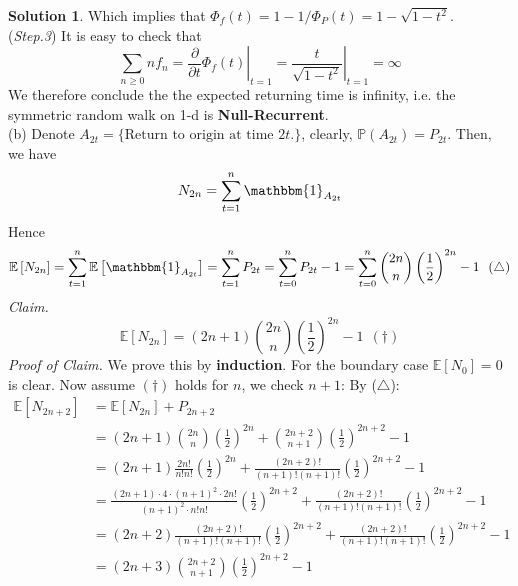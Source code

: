 \documentclass[a4paper, 10pt]{article}
\theoremstyle{definition}
\theoremstyle{hSol}
\newtheorem*{solution}{Solution}
\begin{document}
\begin{solution}
Which implies that $\Phi_f(t) = 1-1/\Phi_P(t)=1-\sqrt{1-t^2}$.\\
(\textit{Step.3}) It is easy to check that
\begin{equation}
  \sum_{n\geq 0} nf_n = \left.\frac{\partial}{\partial t} \Phi_f(t)\right|_{t=1} = \left.\frac{t}{\sqrt{1-t^2}}\right|_{t=1} = \infty
\end{equation}
We therefore conclude the the expected returning time is infinity, i.e. the symmetric random walk on 1-d is \textbf{Null-Recurrent}. \\
(b) Denote $A_{2t}=\{\text{Return to origin at time $2t$.}\}$, clearly, $\mathbb{P}\left(A_{2t}\right)=P_{2t}$. Then, we have
\begin{equation}
    N_{2n} = \sum_{t=1}^n \mathbbm{1}_{A_{2t}}
\end{equation}
Hence
\begin{equation}
  \mathbb{E}\left[N_{2n}\right] = \sum_{t=1}^n \mathbb{E}\left[\mathbbm{1}_{A_{2t}}\right] = \sum_{t=1}^n P_{2t} = \sum_{t=0}^n P_{2t} -1 = \sum_{t=0}^n \binom{2n}{n}\left(\frac{1}{2}\right)^{2n} - 1~~(\triangle)
\end{equation}
\textit{Claim.}
\begin{equation}
  \mathbb{E}\left[N_{2n}\right] = (2n+1)\binom{2n}{n}\left(\frac{1}{2}\right)^{2n} - 1 ~~(\dag)
\end{equation}
\textit{Proof of Claim.} We prove this by \textbf{induction}. For the boundary case $\mathbb{E}\left[N_{0}\right]=0$ is clear. Now assume $(\dag)$ holds for $n$, we check $n+1$: By ($\triangle$):
\begin{equation}
  \begin{split}
    \mathbb{E}\left[N_{2n+2}\right] &= \mathbb{E}\left[N_{2n}\right] + P_{2n+2}\\
    &= (2n+1)\binom{2n}{n}\left(\frac{1}{2}\right)^{2n} + \binom{2n+2}{n+1}\left(\frac{1}{2}\right)^{2n+2}- 1\\
    &= (2n+1)\frac{2n!}{n!n!}\left(\frac{1}{2}\right)^{2n} + \frac{(2n+2)!}{(n+1)!(n+1)!}\left(\frac{1}{2}\right)^{2n+2}-1\\
    &= \frac{(2n+1)\cdot 4\cdot (n+1)^2\cdot 2n!}{(n+1)^2\cdot n!n!}\left(\frac{1}{2}\right)^{2n+2} + \frac{(2n+2)!}{(n+1)!(n+1)!}\left(\frac{1}{2}\right)^{2n+2}-1\\
    &= (2n+2)\frac{(2n+2)!}{(n+1)!(n+1)!}\left(\frac{1}{2}\right)^{2n+2} + \frac{(2n+2)!}{(n+1)!(n+1)!}\left(\frac{1}{2}\right)^{2n+2}-1\\
    &= (2n+3)\binom{2n+2}{n+1}\left(\frac{1}{2}\right)^{2n+2} - 1

\end{split}
\end{equation}
\end{solution}
\end{document}
